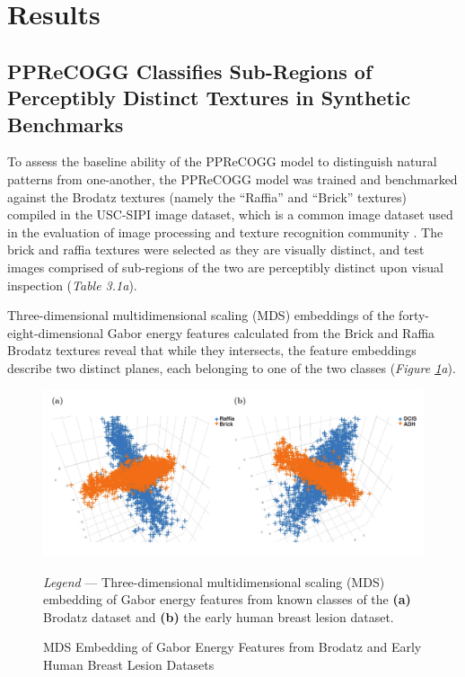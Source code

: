 \newpage
\section{Results}

\subsection{PPReCOGG Classifies Sub-Regions of Perceptibly Distinct Textures in Synthetic Benchmarks}

To assess the baseline ability of the PPReCOGG model to distinguish natural patterns from one-another, the PPReCOGG model was trained and benchmarked against the Brodatz textures (namely the ``Raffia'' and ``Brick'' textures) compiled in the USC-SIPI image dataset, which is a common image dataset used in the evaluation of image processing and texture recognition community \citep{weber1997}. The brick and raffia textures were selected as they are visually distinct, and test images comprised of sub-regions of the two are perceptibly distinct upon visual inspection (\emph{Table 3.1a}).\par

Three-dimensional  multidimensional scaling (MDS) embeddings of the forty-eight-dimensional Gabor energy features calculated from the Brick and Raffia Brodatz textures reveal that while they intersects, the feature embeddings describe two distinct planes, each belonging to one of the two classes (\emph{Figure \ref{embeddings}a}).


\begin{figure}[ht!]
	\begin{center}
	\caption{MDS Embedding of Gabor Energy Features from Brodatz and Early Human Breast Lesion Datasets \label{embeddings}}
	\end{center}
	\includegraphics[width=170mm]{figures/embeddings/figure.pdf}
	 \begin{singlespace}
	 	\textit{Legend} --- Three-dimensional multidimensional scaling (MDS) embedding of Gabor energy features from known classes of the \textbf{(a)} Brodatz dataset and \textbf{(b)} the early human breast lesion dataset.
	 \end{singlespace}
	
\end{figure}




